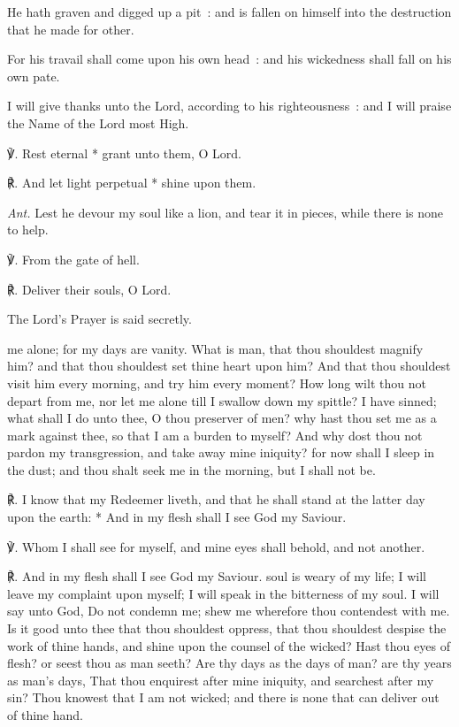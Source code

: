 He hath graven and digged up a pit~: and is fallen on himself into the destruction that he made for other.\par
{}For his travail shall come upon his own head~: and his wickedness shall fall on his own pate.\par
{}I will give thanks unto the Lord, according to his righteousness~: and I will praise the Name of the Lord most High.\par
℣. Rest eternal * grant unto them, O Lord.\par
℟. And let light perpetual * shine upon them.\par\noindent
\textit{Ant.} Lest he devour my soul like a lion, and tear it in pieces, while there is none to help.\par
\vspace{0.5\baselineskip}
℣. From the gate of hell.\par
℟. Deliver their souls, O Lord.\par
\begin{rubric}
    {The Lord's Prayer is said secretly.}
\end{rubric}
 me alone; for my days are vanity. What is man, that thou shouldest magnify him? and that thou shouldest set thine heart upon him? And that thou shouldest visit him every morning, and try him every moment? How long wilt thou not depart from me, nor let me alone till I swallow down my spittle? I have sinned; what shall I do unto thee, O thou preserver of men? why hast thou set me as a mark against thee, so that I am a burden to myself? And why dost thou not pardon my transgression, and take away mine iniquity? for now shall I sleep in the dust; and thou shalt seek me in the morning, but I shall not be.
\par
℟. I know {\dag} that my Redeemer liveth, and that he shall stand at the latter day upon the earth: * And in my flesh shall I see God my Saviour.\par
℣. Whom I shall see for myself, and mine eyes shall behold, and not another.\par
℟. And in my flesh shall I see God my Saviour.
 soul is weary of my life; I will leave my complaint upon myself; I will speak in the bitterness of my soul. I will say unto God, Do not condemn me; shew me wherefore thou contendest with me. Is it good unto thee that thou shouldest oppress, that thou shouldest despise the work of thine hands, and shine upon the counsel of the wicked? Hast thou eyes of flesh? or seest thou as man seeth? Are thy days as the days of man? are thy years as man's days, That thou enquirest after mine iniquity, and searchest after my sin? Thou knowest that I am not wicked; and there is none that can deliver out of thine hand.\par
